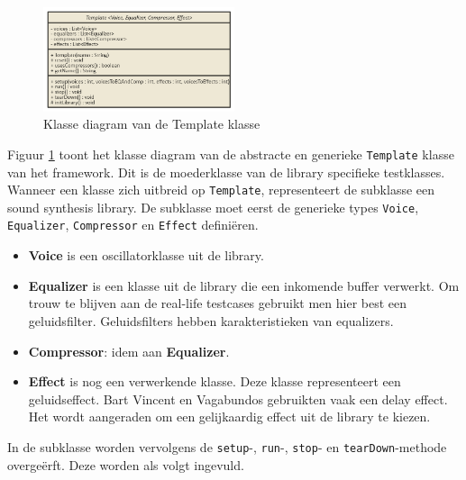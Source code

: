 \begin{figure}
  \centering
    \includegraphics[width=0.5\textwidth]{imgs/nomnoml.png}
  \caption{Klasse diagram van de Template klasse}
  \label{fig:template}
\end{figure}

Figuur \ref{fig:template} toont het klasse diagram van de abstracte en generieke \verb+Template+ klasse van het framework. Dit is de moederklasse van de library specifieke testklasses. Wanneer een klasse zich uitbreid op \verb+Template+, representeert de subklasse een sound synthesis library. De subklasse moet eerst de generieke types \verb+Voice+, \verb+Equalizer+, \verb+Compressor+ en \verb+Effect+ definiëren.

\begin{itemize}
	\item \textbf{Voice} is een oscillatorklasse uit de library.
	\item \textbf{Equalizer} is een klasse uit de library die een inkomende buffer verwerkt. Om trouw te blijven aan de real-life testcases gebruikt men hier best een geluidsfilter. Geluidsfilters hebben karakteristieken van equalizers.
	\item \textbf{Compressor}: idem aan \textbf{Equalizer}.
	\item \textbf{Effect} is nog een verwerkende klasse. Deze klasse representeert een geluidseffect. Bart Vincent en Vagabundos gebruikten vaak een delay effect. \autocite{bartvincent} \autocite{vagabundos} Het wordt aangeraden om een gelijkaardig effect uit de library te kiezen.
\end{itemize}

 In de subklasse worden vervolgens de \verb+setup+-, \verb+run+-, \verb+stop+- en \verb+tearDown+-methode overgeërft. Deze worden als volgt ingevuld.

